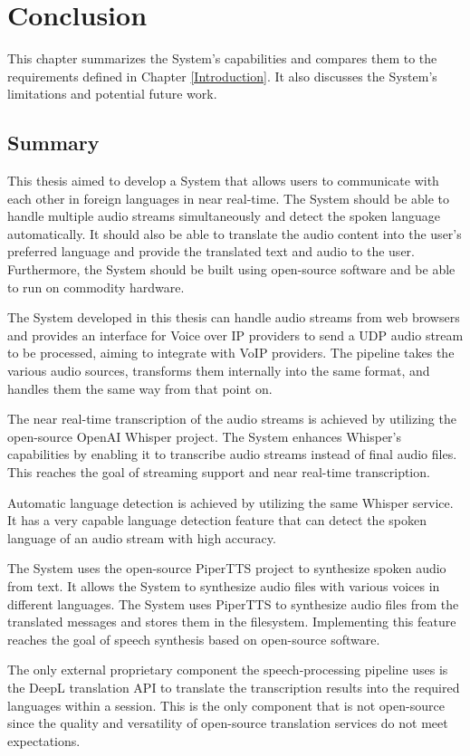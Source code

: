 \chapter{Conclusion}

\label{Conclusion}

This chapter summarizes the System's capabilities and compares them to the requirements defined in Chapter 
\ref{Introduction}. It also discusses the System's limitations and potential future work.


\section{Summary}

This thesis aimed to develop a System that allows users to communicate with each other in foreign languages in near 
real-time. The System should be able to handle multiple audio streams simultaneously and detect the spoken language 
automatically. It should also be able to translate the audio content into the user's preferred language and provide the 
translated text and audio to the user. Furthermore, the System should be built using open-source software and be able 
to run on commodity hardware.

The System developed in this thesis can handle audio streams from web browsers and provides an interface for Voice over 
IP providers to send a UDP audio stream to be processed, aiming to integrate with VoIP providers. The pipeline takes 
the various audio sources, transforms them internally into the same format, and handles them the same way from that 
point on.

The near real-time transcription of the audio streams is achieved by utilizing the open-source OpenAI Whisper project. 
The System enhances Whisper's capabilities by enabling it to transcribe audio streams instead of final audio files. 
This reaches the goal of streaming support and near real-time transcription.

Automatic language detection is achieved by utilizing the same Whisper service. It has a very capable language 
detection feature that can detect the spoken language of an audio stream with high accuracy.

The System uses the open-source PiperTTS project to synthesize spoken audio from text. It allows the System to 
synthesize audio files with various voices in different languages. The System uses PiperTTS to synthesize audio files 
from the translated messages and stores them in the filesystem. Implementing this feature reaches the goal of speech 
synthesis based on open-source software.

The only external proprietary component the speech-processing pipeline uses is the DeepL translation API to translate 
the transcription results into the required languages within a session. This is the only component that is not 
open-source since the quality and versatility of open-source translation services do not meet expectations.

